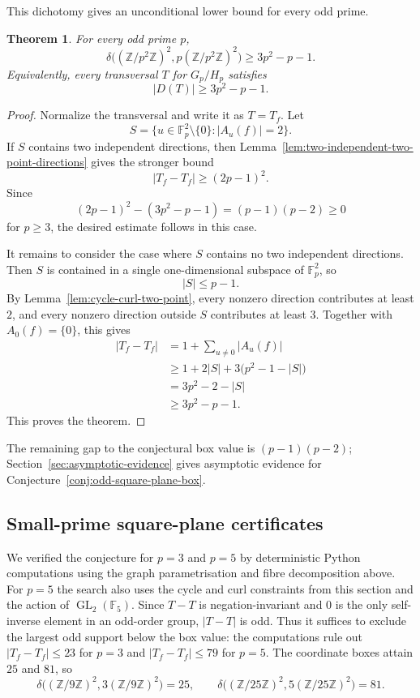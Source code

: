 \documentclass[reqno]{amsart}
\numberwithin{equation}{section}
\newtheorem{theorem}{Theorem}[section]
\theoremstyle{definition}
\begin{document}
This dichotomy gives an unconditional lower bound for every odd prime.
\begin{theorem}
\label{thm:unconditional-square-plane-bound}
For every odd prime $p$,
\[
  \delta\bigl((\mathbb Z/p^2\mathbb Z)^2,
              p(\mathbb Z/p^2\mathbb Z)^2\bigr)
  \geq 3p^2-p-1.
\]
Equivalently, every transversal $T$ for $G_p/H_p$ satisfies
\[
  |D(T)|\geq 3p^2-p-1.
\]
\end{theorem}

\begin{proof}
Normalize the transversal and write it as $T=T_f$.  Let
\[
  S=\{u\in\mathbb F_p^2\setminus\{0\}: |A_u(f)|=2\}.
\]
If $S$ contains two independent directions, then
Lemma~\ref{lem:two-independent-two-point-directions} gives the stronger bound
\[
  |T_f-T_f|\geq (2p-1)^2.
\]
Since
\[
  (2p-1)^2-(3p^2-p-1)=(p-1)(p-2)\geq 0
\]
for $p\geq 3$, the desired estimate follows in this case.

It remains to consider the case where $S$ contains no two independent
directions.  Then $S$ is contained in a single one-dimensional subspace of
$\mathbb F_p^2$, so
\[
  |S|\leq p-1.
\]
By Lemma~\ref{lem:cycle-curl-two-point}, every nonzero direction contributes at
least $2$, and every nonzero direction outside $S$ contributes at least $3$.
Together with $A_0(f)=\{0\}$, this gives
\[
\begin{aligned}
  |T_f-T_f|
  &=1+\sum_{u\neq 0}|A_u(f)| \\
  &\geq 1+2|S|+3\bigl(p^2-1-|S|\bigr) \\
  &=3p^2-2-|S| \\
  &\geq 3p^2-p-1.
\end{aligned}
\]
This proves the theorem.
\end{proof}

The remaining gap to the conjectural box value is \((p-1)(p-2)\);
Section~\ref{sec:asymptotic-evidence} gives asymptotic evidence for
Conjecture~\ref{conj:odd-square-plane-box}.

\subsection{Small-prime square-plane certificates}
\label{subsec:small-prime-certificates}

We verified the conjecture for \(p=3\) and \(p=5\) by deterministic Python
computations using the graph parametrisation and fibre decomposition above.
For \(p=5\) the search also uses the cycle and curl constraints from this
section and the action of \(\operatorname{GL}_2(\mathbb F_5)\).  Since \(T-T\)
is negation-invariant and \(0\) is the only self-inverse element in an odd-order
group, \(|T-T|\) is odd.  Thus it suffices to exclude the largest odd support
below the box value: the computations rule out \(|T_f-T_f|\le 23\) for \(p=3\)
and \(|T_f-T_f|\le 79\) for \(p=5\).  The coordinate boxes attain \(25\) and
\(81\), so
\[
\delta\bigl((\mathbb Z/9\mathbb Z)^2,3(\mathbb Z/9\mathbb Z)^2\bigr)=25,
\qquad
\delta\bigl((\mathbb Z/25\mathbb Z)^2,5(\mathbb Z/25\mathbb Z)^2\bigr)=81.
\]
\end{document}

